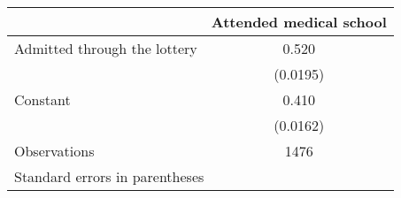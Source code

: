\begin{tabular}{l*{1}{c}}
\hline\hline
                    &\multicolumn{1}{c}{Attended medical school}\\
\hline
Admitted through the lottery&       0.520\\
                    &    (0.0195)\\
[1em]
Constant            &       0.410\\
                    &    (0.0162)\\
\hline
Observations        &        1476\\
\hline\hline
\multicolumn{2}{l}{\footnotesize Standard errors in parentheses}\\
\end{tabular}
